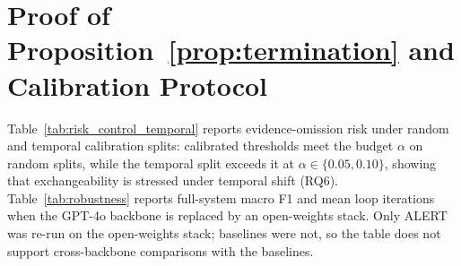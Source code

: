 \section{Proof of Proposition~\ref{prop:termination} and Calibration Protocol}
\label{app:theory}

Table~\ref{tab:risk_control_temporal} reports evidence-omission risk under random and temporal calibration splits: calibrated thresholds meet the budget $\alpha$ on random splits, while the temporal split exceeds it at $\alpha\in\{0.05,0.10\}$, showing that exchangeability is stressed under temporal shift (RQ6).
Table~\ref{tab:robustness} reports full-system macro F1 and mean loop iterations when the GPT-4o backbone is replaced by an open-weights stack. Only ALERT was re-run on the open-weights stack; baselines were not, so the table does not support cross-backbone comparisons with the baselines.

\begin{table}[t!]
\centering
\caption{Evidence-omission risk under random and temporal calibration splits. Lower is better; values should be read as evidence-coverage risk, not severity-label correctness.}
\label{tab:risk_control_temporal}
\small
\setlength{\tabcolsep}{4pt}

\vspace{8pt}

\caption{Full ALERT system under two backbones (mean $\pm$ std over runs). Baselines were not re-run on the open-weights stack.}
\label{tab:robustness}
\small
\setlength{\tabcolsep}{5pt}
\end{table}

